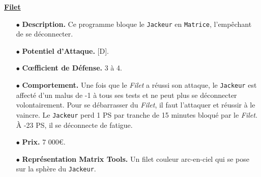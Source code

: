 \documentclass[11pt,twoside,a4paper]{article}
\begin{document}
\begin{multicols*}{2}
\underline{\textbf{Filet}} %
\begin{itemize}
	\small
	\item[$\bullet$] \textbf{Description. }Ce programme bloque le \texttt{Jackeur} en \texttt{Matrice}, l'emp{\^e}chant de se d{\'e}connecter. 
	\item[$\bullet$] \textbf{Potentiel d'Attaque. }[D]. 
	\item[$\bullet$] \textbf{C\oe fficient de D{\'e}fense. }3 {\`a} 4. 
	\item[$\bullet$] \textbf{Comportement. }Une fois que le \emph{Filet} a r{\'e}ussi son attaque, le \texttt{Jackeur} est affect{\'e} d'un malus de -1 {\`a} tous ses tests et ne peut plus se d{\'e}connecter volontairement. Pour se d{\'e}barrasser du \emph{Filet}, il faut l'attaquer et r{\'e}ussir {\`a} le vaincre. Le \texttt{Jackeur} perd 1 PS par tranche de 15 minutes bloqu{\'e} par le \emph{Filet}. {\`A} -23 PS, il se d{\'e}connecte de fatigue. 
	\item[$\bullet$] \textbf{Prix. }7 000\euro . 
	\item[$\bullet$] \textbf{Repr{\'e}sentation Matrix Tools. }Un filet couleur arc-en-ciel qui se pose sur la sph{\`e}re du \texttt{Jackeur}. 
\end{itemize} %


\end{multicols*}
\end{document}
